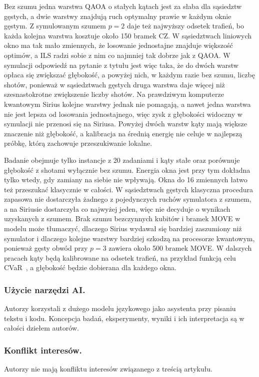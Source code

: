 \documentclass[runningheads]{llncs}
\begin{document}
Bez szumu jedna warstwa QAOA o stałych kątach jest za słaba dla sąsiedztw
gęstych, a dwie warstwy znajdują ruch optymalny prawie w każdym oknie
gęstym. Z symulowanym szumem $p = 2$ daje też najwyższy odsetek trafień, bo
każda kolejna warstwa kosztuje około 150 bramek CZ. W sąsiedztwach liniowych
okno ma tak mało zmiennych, że losowanie jednostajne znajduje większość
optimów, a ILS radzi sobie z nim co najmniej tak dobrze jak z QAOA.
W symulacji odpowiedź na pytanie z tytułu jest więc taka, że do dwóch warstw
opłaca się zwiększać głębokość, a powyżej nich, w każdym razie bez szumu,
liczbę shotów, ponieważ w sąsiedztwach gęstych druga warstwa daje więcej niż
szesnastokrotne zwiększenie liczby shotów. Na prawdziwym komputerze kwantowym Sirius kolejne
warstwy jednak nie pomagają, a nawet jedna warstwa nie jest lepsza od losowania
jednostajnego, więc zysk z głębokości widoczny w symulacji nie przenosi się
na Siriusa. Powyżej dwóch warstw kąty mają większe znaczenie niż głębokość, a kalibracja
na średnią energię nie celuje w najlepszą próbkę, którą zachowuje przeszukiwanie lokalne.

Badanie obejmuje tylko instancje z 20 zadaniami i kąty stałe oraz porównuje
głębokość z shotami wyłącznie bez szumu. Energia okna jest przy tym dokładna
tylko wtedy, gdy zamiany na siebie nie wpływają. Okna do
16 zmiennych łatwo też przeszukać klasycznie w całości. W sąsiedztwach gęstych klasyczna procedura zapasowa nie dostarczyła żadnego
z pojedynczych ruchów symulatora z szumem, a na Siriusie dostarczyła co
najwyżej jeden, więc nie decyduje o wynikach uzyskanych z szumem. Brak szumu bezczynnych kubitów i bramek MOVE w modelu może tłumaczyć, dlaczego Sirius wydawał się bardziej zaszumiony niż
symulator i dlaczego kolejne warstwy bardziej szkodzą na procesorze kwantowym, ponieważ gęsty obwód przy $p = 3$ zawiera około 500 bramek MOVE. W dalszych pracach kąty
będą kalibrowane na odsetek trafień,
na przykład funkcją celu CVaR~\cite{barkoutsos2020cvar}, a głębokość będzie
dobierana dla każdego okna.

\begin{credits}
\subsubsection{Użycie narzędzi AI.} Autorzy korzystali z dużego modelu
językowego jako asystenta przy pisaniu tekstu i kodu. Koncepcja badań,
eksperymenty, wyniki i ich interpretacja są w całości dziełem autorów.

\subsubsection{Konflikt interesów.} Autorzy nie mają konfliktu interesów
związanego z treścią artykułu.
\end{credits}



\end{document}
